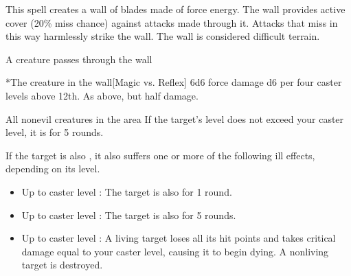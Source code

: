 \begin{spellheader}
    \spelldur{\durshort \dismissable}
\end{spellheader}
\begin{spelleffects}
    \spellline
    \spelleffect This spell creates a wall of blades made of force energy. The wall provides active cover (20\% miss chance) against attacks made through it. Attacks that miss in this way harmlessly strike the wall. The wall is considered difficult terrain.
    \begin{spelltrigger}{A creature passes through the wall}
        \begin{spelltarget}*{The creature in the wall}[Magic vs. Reflex]
            \spellsuccess 6d6 force damage \add d6 per four caster levels above 12th.
            \spellfailure As above, but half damage.
        \end{spelltarget}
    \end{spelltrigger}
\end{spelleffects}

\begin{spellheader}
\end{spellheader}
\begin{spelleffects}
    \begin{spelltargets}{All nonevil creatures in the area}
        \spelleffect If the target's level does not exceed your caster level, it is \sickened for 5 rounds.

        If the target is also \bloodied, it also suffers one or more of the following ill effects, depending on its level.
        \begin{itemize}
            \item Up to caster level : The target is also \nauseated for 1 round.
            \item Up to caster level : The target is also \paralyzed for 5 rounds.
            \item Up to caster level : A living target loses all its hit points and takes critical damage equal to your caster level, causing it to begin dying. A nonliving target is destroyed.
        \end{itemize}
    \end{spelltargets}
\end{spelleffects}

